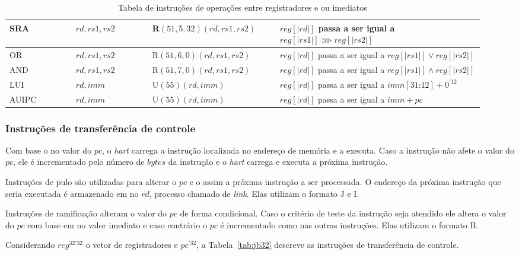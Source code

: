 \begin{table}
\begin{tabular}{ |p{0.13\linewidth}||p{0.15\linewidth}|p{0.25\linewidth}|p{0.40\linewidth}| }
SRA & $rd, rs1, rs2$ & R$(51, 5, 32)(rd, rs1, rs2)$ & $reg[|rd|]$ passa a ser igual a ${reg[|rs1|] \ggg reg[|rs2|]}$ \\ \hline
OR & $rd, rs1, rs2$ & R$(51, 6, 0)(rd, rs1, rs2)$ & $reg[|rd|]$ passa a ser igual a ${reg[|rs1|] \lor reg[|rs2|]}$ \\ \hline
AND & $rd, rs1, rs2$ & R$(51, 7, 0)(rd, rs1, rs2)$ & $reg[|rd|]$ passa a ser igual a ${reg[|rs1|] \land reg[|rs2|]}$ \\ \hline
LUI & $rd, imm$ & U$(55)(rd, imm)$ & $reg[|rd|]$ passa a ser igual a ${imm[31\text{:}12] + 0^{'12}}$ \\ \hline
AUIPC & $rd, imm$ & U$(55)(rd, imm)$ & $reg[|rd|]$ passa a ser igual a ${imm + pc}$ \\ \hline

    \end{tabular}
  \caption{Tabela de instruções de operações entre registradores e ou imediatos \label{tab:op32}}
  \end{table}

\subsubsection{Instruções de transferência de controle}
\label{ssec:jmp}

  Com base o no valor do $pc$, o \emph{hart} carrega a instrução localizada no endereço de memória
  e a executa. Caso a instrução não afete o valor do $pc$, ele é incrementado pelo número
  de $bytes$ da instrução e o \emph{hart} carrega e executa a próxima instrução.

  Instruções de pulo são utilizadas para alterar o $pc$ e o assim a próxima instrução a ser
  processada. O endereço da próxima instrução que
  seria executada é armazenado em no $rd$, processo chamado de \emph{link}. Elas utilizam o formato J e I.

  Instruções de ramificação alteram o valor do $pc$ de forma condicional. Caso o critério de teste
  da instrução seja atendido ele altera o valor do $pc$ com base em no valor imediato e caso contrário
  o $pc$ é incrementado como nas outras instruções. Elas utilizam o formato B.

  Considerando $reg^{32'32}$ o vetor de registradores e $pc^{'32}$, a
  Tabela~\ref{tab:jb32} descreve as instruções de transferência de controle.

